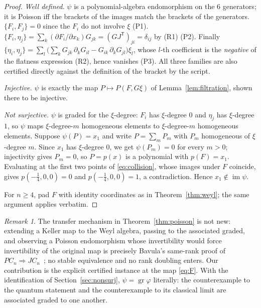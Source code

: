 \documentclass[11pt]{article}
\theoremstyle{remark}
\newtheorem{remark}[theorem]{Remark}
\newcommand{\gr}{\operatorname{gr}}
\begin{document}
\begin{proof}
\emph{Well defined.} $\psi$ is a polynomial-algebra endomorphism on the
$6$ generators; it is Poisson iff the brackets of the images match the
brackets of the generators. $\{F_i,F_j\}=0$ since the $F_i$ do not involve
$\xi$ (P1). $\{F_i,\eta_j\}=\sum_k (\partial F_i/\partial x_k)
G_{jk}=(G J^{\mathsf T})_{ji}=\delta_{ij}$ by (R1) (P2). Finally
$\{\eta_i,\eta_j\}=\sum_l\bigl(\sum_k G_{jk}\,\partial_k G_{il}-
G_{ik}\,\partial_k G_{jl}\bigr)\xi_l$, whose $l$-th coefficient is the
\emph{negative} of the flatness expression (R2), hence vanishes (P3). All
three families are also certified directly against the definition of the
bracket by the script.

\emph{Injective.} $\psi$ is exactly the map $P\mapsto P(F,G\xi)$ of
Lemma~\ref{lem:filtration}, shown there to be injective.

\emph{Not surjective.} $\psi$ is graded for the $\xi$-degree: $F_i$ has
$\xi$-degree $0$ and $\eta_j$ has $\xi$-degree $1$, so $\psi$ maps
$\xi$-degree-$m$ homogeneous elements to $\xi$-degree-$m$ homogeneous
elements. Suppose $\psi(P)=x_1$ and write $P=\sum_m P_m$ with $P_m$
homogeneous of $\xi$-degree $m$. Since $x_1$ has $\xi$-degree $0$, we get
$\psi(P_m)=0$ for every $m>0$; injectivity gives $P_m=0$, so $P=p(x)$ is a
polynomial with $p(F)=x_1$. Evaluating at the first two points of
\eqref{eq:collision}, whose images under $F$ coincide, gives
$p(-\tfrac14,0,0)=0$ and $p(-\tfrac14,0,0)=1$, a contradiction. Hence
$x_1\notin\operatorname{im}\psi$.

For $n\ge4$, pad $F$ with identity coordinates as in
Theorem~\ref{thm:weyl}; the same argument applies verbatim.
\end{proof}

\begin{remark}
The transfer mechanism in Theorem~\ref{thm:poisson} is not new: extending
a Keller map to the Weyl algebra, passing to the associated graded, and
observing a Poisson endomorphism whose invertibility would force
invertibility of the original map is precisely Bavula's same-rank proof of
$PC_n\Rightarrow JC_n$~\cite[Thm.~7]{Bavula2024}; no stable equivalence
and no rank doubling enters. Our contribution is the explicit certified
instance at the map \eqref{eq:F}. With the identification of
Section~\ref{sec:nonsurj}, $\psi=\gr\varphi$ literally: the counterexample
to the quantum statement and the counterexample to its classical limit are
associated graded to one another.
\end{remark}
\end{document}
